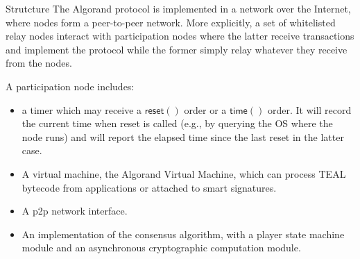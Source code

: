 \documentclass[10pt,a4paper]{article}
\begin{document}
\begin{section}{Strutcture}
The Algorand protocol is implemented in a network over the Internet, where nodes 
form a peer-to-peer network. More explicitly, a set of whitelisted relay nodes 
interact with participation nodes where the latter receive transactions and
implement the protocol while the former simply relay whatever they receive from
the nodes.


A participation node includes:
\begin{itemize}
    \item a timer which may receive a $\mathsf{reset()}$ order or a $\mathsf{time()}$
order. It will record the current time when reset is called (e.g., by querying
the OS where the node runs) and will report the elapsed time since the last reset
in the latter case.
    \item A virtual machine, the Algorand Virtual Machine, which can process TEAL bytecode
from applications or attached to smart signatures. %
    \item A p2p network interface.
    \item An implementation of the consensus algorithm, with a player state machine module and
an asynchronous cryptographic computation module.
\end{itemize}



\end{section}
\end{document}
